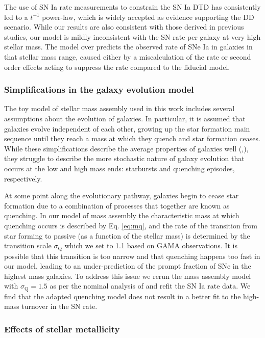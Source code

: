 \documentclass[fleqn,usenatbib]{mnras}
\begin{document}
The use of SN Ia rate measurements to constrain the SN Ia DTD has consistently led to a $t^{-1}$ power-law, which is widely accepted as evidence supporting the DD scenario. While our results are also consistent with those derived in previous studies, our model is mildly inconsistent with the SN rate per galaxy at very high stellar mass. The model over predicts the observed rate of SNe Ia in galaxies in that stellar mass range, caused either by a miscalculation of the rate or second order effects acting to suppress the rate compared to the fiducial model.

\subsubsection{Simplifications in the galaxy evolution model}

The toy model of stellar mass assembly used in this work includes several assumptions about the evolution of galaxies. In particular, it is assumed that galaxies evolve independent of each other, growing up the star formation main sequence until they reach a mass at which they quench and star formation ceases. While these simplifications describe the average properties of galaxies well (\citealt{Zahid2012},), they struggle to describe the more stochastic nature of galaxy evolution that occurs at the low and high mass ends: starbursts and quenching episodes, respectively. 

At some point along the evolutionary pathway, galaxies begin to cease star formation due to a combination of processes that together are known as quenching. In our model of mass assembly the characteristic mass at which quenching occurs is described by Eq. \ref{eq:mq}, and the rate of the transition from star forming to passive (as a function of the stellar mass) is determined by the transition scale $\sigma_{\mathrm{Q}}$ which we set to 1.1 based on GAMA observations. It is possible that this transition is too narrow and that quenching happens too fast in our model, leading to an under-prediction of the prompt fraction of SNe in the highest mass galaxies. To address this issue we rerun the mass assembly model with $\sigma_{\mathrm{Q}} = 1.5$ as per the nominal analysis of  and refit the SN Ia rate data. We find that the adapted quenching model does not result in a better fit to the high-mass turnover in the SN rate.

\subsubsection{Effects of stellar metallicity}
\end{document}

